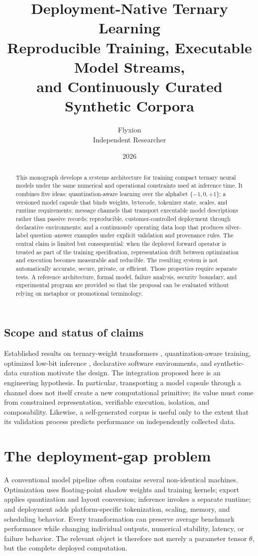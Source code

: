 \documentclass[11pt]{article}
\title{\textbf{Deployment-Native Ternary Learning}\\[0.3em]
\large Reproducible Training, Executable Model Streams,\\ and Continuously Curated Synthetic Corpora}
\author{Flyxion \\ Independent Researcher}
\date{2026}
\begin{document}
\maketitle

\begin{abstract}
\noindent This monograph develops a systems architecture for training compact ternary neural models under the same numerical and operational constraints used at inference time. It combines five ideas: quantization-aware learning over the alphabet $\{-1,0,+1\}$; a versioned model capsule that binds weights, bytecode, tokenizer state, scales, and runtime requirements; message channels that transport executable model descriptions rather than passive records; reproducible, customer-controlled deployment through declarative environments; and a continuously operating data loop that produces silver-label question--answer examples under explicit validation and provenance rules. The central claim is limited but consequential: when the deployed forward operator is treated as part of the training specification, representation drift between optimization and execution becomes measurable and reducible. The resulting system is not automatically accurate, secure, private, or efficient. Those properties require separate tests. A reference architecture, formal model, failure analysis, security boundary, and experimental program are provided so that the proposal can be evaluated without relying on metaphor or promotional terminology.
\end{abstract}

\subsection*{Scope and status of claims}
Established results on ternary-weight transformers \cite{wang2023}, quantization-aware training, optimized low-bit inference \cite{wang2025}, declarative software environments, and synthetic-data curation motivate the design. The integration proposed here is an engineering hypothesis. In particular, transporting a model capsule through a channel does not itself create a new computational primitive; its value must come from constrained representation, verifiable execution, isolation, and composability. Likewise, a self-generated corpus is useful only to the extent that its validation process predicts performance on independently collected data.

\section{The deployment-gap problem}
A conventional model pipeline often contains several non-identical machines. Optimization uses floating-point shadow weights and training kernels; export applies quantization and layout conversion; inference invokes a separate runtime; and deployment adds platform-specific tokenization, scaling, memory, and scheduling behavior. Every transformation can preserve average benchmark performance while changing individual outputs, numerical stability, latency, or failure behavior. The relevant object is therefore not merely a parameter tensor $\theta$, but the complete deployed computation.
\end{document}
